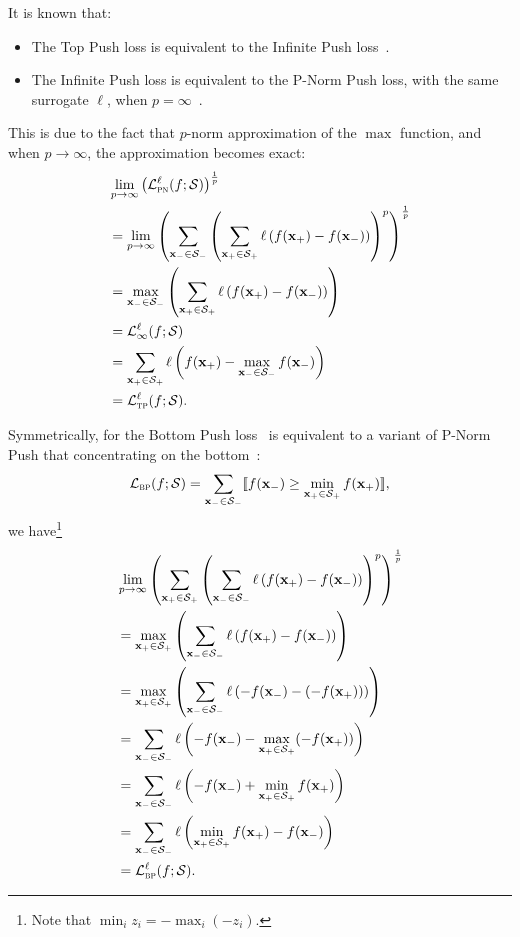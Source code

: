 It is known that:
\begin{itemize}
\item The Top Push loss is equivalent to the Infinite Push loss~\cite{li2014top}.
\item The Infinite Push loss is equivalent to the P-Norm Push loss, with the same surrogate $\ell$,
      when $p = \infty$~\cite{agarwal2011infinite,rakotomamonjy2012sparse}.
\end{itemize}
This is due to the fact that $p$-norm approximation of the $\max$ function, and when $p \to \infty$,
the approximation becomes exact:
\begin{equation}
\label{eq:pn2tp}
\begin{aligned}
&  \lim_{p \to \infty} \left( \mathcal{L}_\textsc{pn}^\ell (f; \mathcal{S}) \right)^\frac{1}{p} \\
&= \lim_{p \to \infty} \left( \sum_{\mathbf{x}_- \in \mathcal{S}_-} \left( \sum_{\mathbf{x}_+ \in \mathcal{S}_+} 
   \ell \left( f(\mathbf{x}_+) - f(\mathbf{x}_-) \right) \right)^p \right)^\frac{1}{p} \\
&= \max_{\mathbf{x}_- \in \mathcal{S}_-} \left( \sum_{\mathbf{x}_+ \in \mathcal{S}_+} \ell \left( f(\mathbf{x}_+) - f(\mathbf{x}_-) \right) \right) \\
&= \mathcal{L}_\infty^\ell (f; \mathcal{S}) \\
&= \sum_{\mathbf{x}_+ \in \mathcal{S}_+} \ell \left( f(\mathbf{x}_+) - \max_{\mathbf{x}_- \in \mathcal{S}_-} f(\mathbf{x}_-) \right) \\
&= \mathcal{L}_\textsc{tp}^\ell (f; \mathcal{S}).
\end{aligned}
\end{equation}

Symmetrically, for the Bottom Push loss~\cite{?} is equivalent to a variant of P-Norm Push that concentrating on the bottom~\cite{rudin2009p}:
\begin{equation*}
\mathcal{L}_\textsc{bp}(f; \mathcal{S})
= \sum_{\mathbf{x}_- \in \mathcal{S}_-} \llbracket f(\mathbf{x}_-) \ge \min_{\mathbf{x}_+ \in \mathcal{S}_+} f(\mathbf{x}_+) \rrbracket,
\end{equation*}
we have\footnote{Note that $\min_{i} z_i = -\max_i (-z_i)$.}
\begin{equation}
\label{eq:pnp2bp}
\begin{aligned}
&  \lim_{p \to \infty} \left( \sum_{\mathbf{x}_+ \in \mathcal{S}_+} \left( \sum_{\mathbf{x}_- \in \mathcal{S}_-} 
   \ell \left( f(\mathbf{x}_+) - f(\mathbf{x}_-) \right) \right)^p \right)^\frac{1}{p} \\
&= \max_{\mathbf{x}_+ \in \mathcal{S}_+} \left( \sum_{\mathbf{x}_- \in \mathcal{S}_-} \ell \left( f(\mathbf{x}_+) - f(\mathbf{x}_-) \right) \right) \\
&= \max_{\mathbf{x}_+ \in \mathcal{S}_+} \left( \sum_{\mathbf{x}_- \in \mathcal{S}_-} \ell \left(-f(\mathbf{x}_-) - (-f(\mathbf{x}_+)) \right) \right) \\
&= \sum_{\mathbf{x}_- \in \mathcal{S}_-} \ell \left( -f(\mathbf{x}_-) - \max_{\mathbf{x}_+ \in \mathcal{S}_+} (-f(\mathbf{x}_+)) \right) \\
&= \sum_{\mathbf{x}_- \in \mathcal{S}_-} \ell \left( -f(\mathbf{x}_-) + \min_{\mathbf{x}_+ \in \mathcal{S}_+} f(\mathbf{x}_+) \right) \\
&= \sum_{\mathbf{x}_- \in \mathcal{S}_-} \ell \left(\min_{\mathbf{x}_+ \in \mathcal{S}_+} f(\mathbf{x}_+) - f(\mathbf{x}_-) \right) \\
&= \mathcal{L}_\textsc{bp}^\ell (f; \mathcal{S}).
\end{aligned}
\end{equation}

